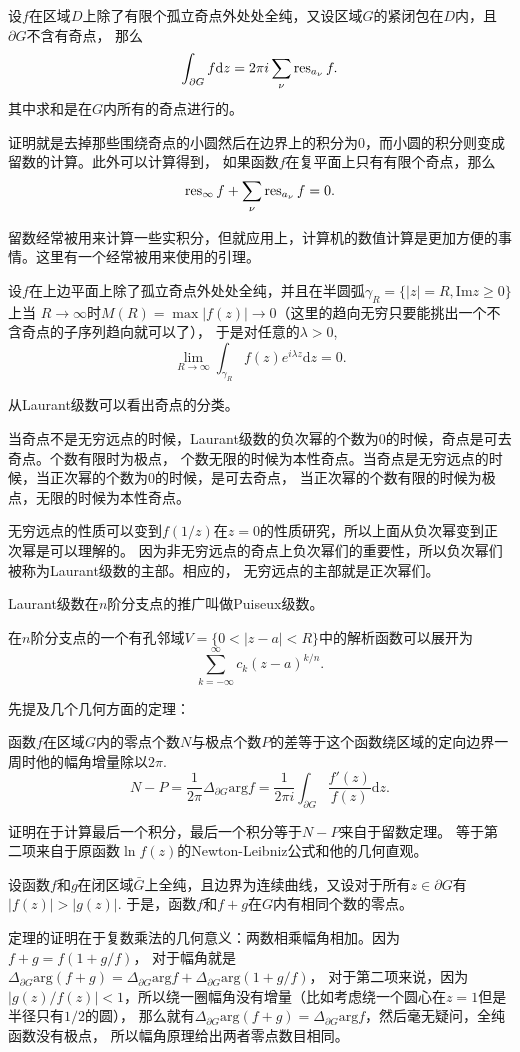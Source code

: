\begin{thm}[Cauchy留数定理]
	设$f$在区域$D$上除了有限个孤立奇点外处处全纯，又设区域$G$的紧闭包在$D$内，且$\partial G$不含有奇点，
    那么\[\int_{\partial G}f\mathrm{d}z=2\pi i \sum_\nu \operatorname{res}_{a_\nu}f.\]其中求和是在$G$内所有的奇点进行的。
\end{thm}
证明就是去掉那些围绕奇点的小圆然后在边界上的积分为0，而小圆的积分则变成留数的计算。此外可以计算得到，
如果函数$f$在复平面上只有有限个奇点，那么\[\operatorname{res}_{\infty}f+\sum_\nu \operatorname{res}_{a_\nu}f=0.\]

留数经常被用来计算一些实积分，但就应用上，计算机的数值计算是更加方便的事情。这里有一个经常被用来使用的引理。

\begin{lem}[Jordan引理]
    设$f$在上边平面上除了孤立奇点外处处全纯，并且在半圆弧$\gamma_R=\{|z|=R,\mathrm{Im}z\geq 0\}$上当
    $R\to \infty$时$M(R)=\max |f(z)| \to 0$（这里的趋向无穷只要能挑出一个不含奇点的子序列趋向就可以了），
    于是对任意的$\lambda>0$,\[\lim_{R\to \infty}\int_{\gamma_R}f(z)e^{i\lambda z}\mathrm{d}z=0.\]
\end{lem}
从Laurant级数可以看出奇点的分类。
\begin{pro}
当奇点不是无穷远点的时候，Laurant级数的负次幂的个数为$0$的时候，奇点是可去奇点。个数有限时为极点，
个数无限的时候为本性奇点。当奇点是无穷远点的时候，当正次幂的个数为$0$的时候，是可去奇点，
当正次幂的个数有限的时候为极点，无限的时候为本性奇点。
\end{pro}
无穷远点的性质可以变到$f(1/z)$在$z=0$的性质研究，所以上面从负次幂变到正次幂是可以理解的。
因为非无穷远点的奇点上负次幂们的重要性，所以负次幂们被称为Laurant级数的主部。相应的，
无穷远点的主部就是正次幂们。

Laurant级数在$n$阶分支点的推广叫做Puiseux级数。
\begin{pro}[Puiseux级数]
    在$n$阶分支点的一个有孔邻域$V=\{0<|z-a|<R\}$中的解析函数可以展开为
    \[\sum_{k=-\infty}^\infty c_k(z-a)^{k/n}.\]
\end{pro}
先提及几个几何方面的定理：
\begin{pro}[幅角原理]
函数$f$在区域$G$内的零点个数$N$与极点个数$P$的差等于这个函数绕区域的定向边界一周时他的幅角增量除以$2\pi$.
\[
N-P=\frac{1}{2\pi}\Delta_{\partial G}\mathrm{arg}f=\frac{1}{2\pi i}\int_{\partial G}\frac{f'(z)}{f(z)}\mathrm{d}z.
\]
\end{pro}
证明在于计算最后一个积分，最后一个积分等于$N-P$来自于留数定理。
等于第二项来自于原函数$\ln f(z)$的Newton-Leibniz公式和他的几何直观。

\begin{pro}[Rouche定理]
    设函数$f$和$g$在闭区域$\bar{G}$上全纯，且边界为连续曲线，又设对于所有$z\in \partial G$有$|f(z)|>|g(z)|$.
    于是，函数$f$和$f+g$在$G$内有相同个数的零点。
\end{pro}
定理的证明在于复数乘法的几何意义：两数相乘幅角相加。因为$f+g=f(1+g/f)$，
对于幅角就是
$\Delta_{\partial G}\mathrm{arg}(f+g)=\Delta_{\partial G}\mathrm{arg}f+\Delta_{\partial G}\mathrm{arg}(1+g/f)$，
对于第二项来说，因为$|g(z)/f(z)|<1$，所以绕一圈幅角没有增量（比如考虑绕一个圆心在$z=1$但是半径只有$1/2$的圆），
那么就有$\Delta_{\partial G}\mathrm{arg}(f+g)=\Delta_{\partial G}\mathrm{arg}f$，然后毫无疑问，全纯函数没有极点，
所以幅角原理给出两者零点数目相同。

